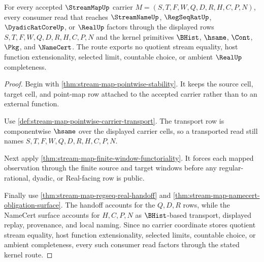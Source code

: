 \begin{theorem}
\label{thm:stream-map-scope-kernel-route}
For every accepted $\StreamMapUp$ carrier $M=(S,T,F,W,Q,D,R,H,C,P,N)$, every consumer read that reaches $\StreamNameUp$, $\RegSeqRatUp$, $\DyadicRatCoreUp$, or $\RealUp$ factors through the displayed rows $S,T,F,W,Q,D,R,H,C,P,N$ and the kernel primitives $\BHist$, $\hsame$, $\Cont$, $\Pkg$, and $\NameCert$. The route exports no quotient stream equality, host function extensionality, selected limit, countable choice, or ambient $\RealUp$ completeness.
\end{theorem}
\begin{proof}
Begin with \autoref{thm:stream-map-pointwise-stability}. It keeps the source cell, target cell, and point-map row attached to the accepted carrier rather than to an external function.

Use \autoref{def:stream-map-pointwise-carrier-transport}. The transport row is componentwise $\hsame$ over the displayed carrier cells, so a transported read still names $S,T,F,W,Q,D,R,H,C,P,N$.

Next apply \autoref{thm:stream-map-finite-window-functoriality}. It forces each mapped observation through the finite source and target windows before any regular-rational, dyadic, or Real-facing row is public.

Finally use \autoref{thm:stream-map-regseq-real-handoff} and \autoref{thm:stream-map-namecert-obligation-surface}. The handoff accounts for the $Q,D,R$ rows, while the NameCert surface accounts for $H,C,P,N$ as $\BHist$-based transport, displayed replay, provenance, and local naming. Since no carrier coordinate stores quotient stream equality, host function extensionality, selected limits, countable choice, or ambient completeness, every such consumer read factors through the stated kernel route.
\end{proof}



